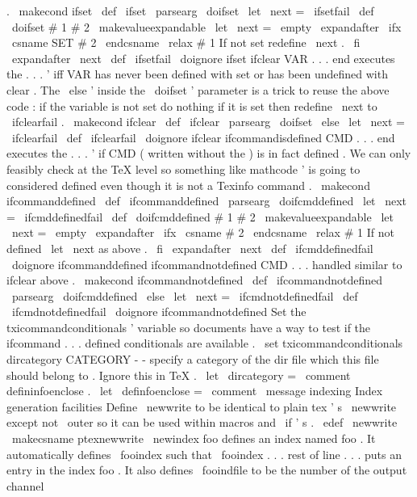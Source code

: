 {{{.
%
\
makecond
{
ifset
}
\
def
\
ifset
{
\
parsearg
{
\
doifset
{
\
let
\
next
=
\
ifsetfail
}
}
}
\
def
\
doifset
#
1
#
2
{
%
{
%
\
makevalueexpandable
\
let
\
next
=
\
empty
\
expandafter
\
ifx
\
csname
SET
#
2
\
endcsname
\
relax
#
1
%
If
not
set
redefine
\
next
.
\
fi
\
expandafter
}
\
next
}
\
def
\
ifsetfail
{
\
doignore
{
ifset
}
}
%
ifclear
VAR
.
.
.
end
executes
the
.
.
.
'
iff
VAR
has
never
been
%
defined
with
set
or
has
been
undefined
with
clear
.
%
%
The
\
else
'
inside
the
\
doifset
'
parameter
is
a
trick
to
reuse
the
%
above
code
:
if
the
variable
is
not
set
do
nothing
if
it
is
set
%
then
redefine
\
next
to
\
ifclearfail
.
%
\
makecond
{
ifclear
}
\
def
\
ifclear
{
\
parsearg
{
\
doifset
{
\
else
\
let
\
next
=
\
ifclearfail
}
}
}
\
def
\
ifclearfail
{
\
doignore
{
ifclear
}
}
%
ifcommandisdefined
CMD
.
.
.
end
executes
the
.
.
.
'
if
CMD
(
written
%
without
the
)
is
in
fact
defined
.
We
can
only
feasibly
check
at
the
%
TeX
level
so
something
like
mathcode
'
is
going
to
considered
%
defined
even
though
it
is
not
a
Texinfo
command
.
%
\
makecond
{
ifcommanddefined
}
\
def
\
ifcommanddefined
{
\
parsearg
{
\
doifcmddefined
{
\
let
\
next
=
\
ifcmddefinedfail
}
}
}
%
\
def
\
doifcmddefined
#
1
#
2
{
{
%
\
makevalueexpandable
\
let
\
next
=
\
empty
\
expandafter
\
ifx
\
csname
#
2
\
endcsname
\
relax
#
1
%
If
not
defined
\
let
\
next
as
above
.
\
fi
\
expandafter
}
\
next
}
\
def
\
ifcmddefinedfail
{
\
doignore
{
ifcommanddefined
}
}
%
ifcommandnotdefined
CMD
.
.
.
handled
similar
to
ifclear
above
.
\
makecond
{
ifcommandnotdefined
}
\
def
\
ifcommandnotdefined
{
%
\
parsearg
{
\
doifcmddefined
{
\
else
\
let
\
next
=
\
ifcmdnotdefinedfail
}
}
}
\
def
\
ifcmdnotdefinedfail
{
\
doignore
{
ifcommandnotdefined
}
}
%
Set
the
txicommandconditionals
'
variable
so
documents
have
a
way
to
%
test
if
the
ifcommand
.
.
.
defined
conditionals
are
available
.
\
set
txicommandconditionals
%
dircategory
CATEGORY
-
-
specify
a
category
of
the
dir
file
%
which
this
file
should
belong
to
.
Ignore
this
in
TeX
.
\
let
\
dircategory
=
\
comment
%
defininfoenclose
.
\
let
\
definfoenclose
=
\
comment
\
message
{
indexing
}
%
Index
generation
facilities
%
Define
\
newwrite
to
be
identical
to
plain
tex
'
s
\
newwrite
%
except
not
\
outer
so
it
can
be
used
within
macros
and
\
if
'
s
.
\
edef
\
newwrite
{
\
makecsname
{
ptexnewwrite
}
}
%
\
newindex
{
foo
}
defines
an
index
named
foo
.
%
It
automatically
defines
\
fooindex
such
that
%
\
fooindex
.
.
.
rest
of
line
.
.
.
puts
an
entry
in
the
index
foo
.
%
It
also
defines
\
fooindfile
to
be
the
number
of
the
output
channel
}}}

